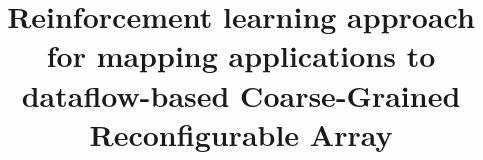 \documentclass[sigplan,screen]{acmart}
\begin{document}
\title{Reinforcement learning approach for mapping applications to dataflow-based Coarse-Grained Reconfigurable Array }








\end{document}
